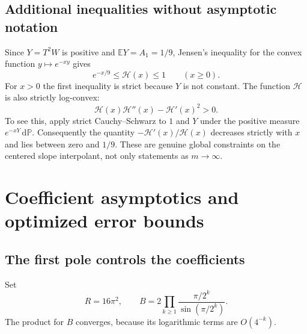 \documentclass[11pt,a4paper,oneside,openany]{book}
\numberwithin{equation}{chapter}
\theoremstyle{definition}
\theoremstyle{remark}
\newcommand{\E}{\mathbb E}
\newcommand{\dd}{\,\mathrm d}
\newcommand{\calH}{\mathcal H}
\begin{document}
\section{Additional inequalities without asymptotic notation}
Since $Y=T^2W$ is positive and $\E Y=A_1=1/9$, Jensen's inequality
for the convex function $y\mapsto e^{-xy}$ gives
\begin{equation}
 e^{-x/9}\le\calH(x)\le1\qquad(x\ge0).
 \label{dc:eq:Jensen}
\end{equation}
For $x>0$ the first inequality is strict because $Y$ is not
constant. The function $\calH$ is also strictly log-convex:
\begin{equation}
 \calH(x)\calH''(x)-\calH'(x)^2>0.
 \label{dc:eq:calH-logconvex}
\end{equation}
To see this, apply strict Cauchy--Schwarz to $1$ and $Y$ under the
positive measure $e^{-xY}\dd\mathbb P$. Consequently the quantity
$-\calH'(x)/\calH(x)$ decreases strictly with $x$ and lies between
zero and $1/9$. These are genuine global constraints on the centered
slope interpolant, not only statements as $m\to\infty$.
\chapter{Coefficient asymptotics and optimized error bounds}
\label{dc:sec:optimal}

\section{The first pole controls the coefficients}
Set
\begin{equation}
 R=16\pi^2,\qquad
 B=2\prod_{k\ge1}\frac{\pi/2^k}{\sin(\pi/2^k)}.
 \label{dc:eq:RB}
\end{equation}
The product for $B$ converges, because its logarithmic terms are
$O(4^{-k})$.
\end{document}
